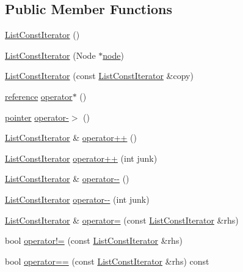\subsection*{Public Member Functions}
\begin{DoxyCompactItemize}
\item 
\hyperlink{structprism_1_1_list_const_iterator_a6ddfef491621bcfdba8248c7d5c85016}{List\+Const\+Iterator} ()
\item 
\hyperlink{structprism_1_1_list_const_iterator_ae0f3f8a05448f942444ccef8f20b89c8}{List\+Const\+Iterator} (Node $\ast$\hyperlink{structprism_1_1_list_const_iterator_a373ff5f84e74e50e52ff94162207d68e}{node})
\item 
\hyperlink{structprism_1_1_list_const_iterator_a3776105d19fc71373abe91be535bb9fe}{List\+Const\+Iterator} (const \hyperlink{structprism_1_1_list_const_iterator}{List\+Const\+Iterator} \&copy)
\item 
\hyperlink{structprism_1_1_list_const_iterator_ad35238dd195319f3f07c12769b52b472}{reference} \hyperlink{structprism_1_1_list_const_iterator_aa21636d257b33f6e83afbae61fae1d58}{operator$\ast$} ()
\item 
\hyperlink{structprism_1_1_list_const_iterator_a1c92e5a7b7d0a92c744027ca421cb651}{pointer} \hyperlink{structprism_1_1_list_const_iterator_abeef58a458ff748c5c63127632e8b5e4}{operator-\/$>$} ()
\item 
\hyperlink{structprism_1_1_list_const_iterator}{List\+Const\+Iterator} \& \hyperlink{structprism_1_1_list_const_iterator_afbfcf2f852a8f297d56ff24aed33dae3}{operator++} ()
\item 
\hyperlink{structprism_1_1_list_const_iterator}{List\+Const\+Iterator} \hyperlink{structprism_1_1_list_const_iterator_a60da75fcfe7e985ac723eec1312db257}{operator++} (int junk)
\item 
\hyperlink{structprism_1_1_list_const_iterator}{List\+Const\+Iterator} \& \hyperlink{structprism_1_1_list_const_iterator_ae1f6d26f39625bad868f2e6a791d0a82}{operator-\/-\/} ()
\item 
\hyperlink{structprism_1_1_list_const_iterator}{List\+Const\+Iterator} \hyperlink{structprism_1_1_list_const_iterator_a986dd5c50149d6737d1464b6faae3946}{operator-\/-\/} (int junk)
\item 
\hyperlink{structprism_1_1_list_const_iterator}{List\+Const\+Iterator} \& \hyperlink{structprism_1_1_list_const_iterator_a30240babbcba4c113fb3731716b83c58}{operator=} (const \hyperlink{structprism_1_1_list_const_iterator}{List\+Const\+Iterator} \&rhs)
\item 
bool \hyperlink{structprism_1_1_list_const_iterator_aa281dd74add7580e06fb32c0db15f8a4}{operator!=} (const \hyperlink{structprism_1_1_list_const_iterator}{List\+Const\+Iterator} \&rhs)
\item 
bool \hyperlink{structprism_1_1_list_const_iterator_adf7ad866935bcde788ea29ed23e9d990}{operator==} (const \hyperlink{structprism_1_1_list_const_iterator}{List\+Const\+Iterator} \&rhs) const 
\end{DoxyCompactItemize}
